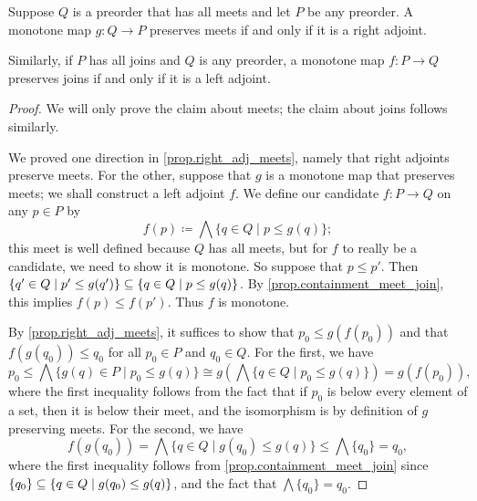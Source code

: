 \documentclass[7Sketches]{subfiles}
\begin{document}
\begin{theorem}%
\label{prop.adjoint_functor_thm}%
Suppose $Q$ is a preorder that has all meets and let $P$ be any preorder. A monotone map $g\colon Q \to P$
preserves meets if and only if it is a right adjoint. 

Similarly, if $P$ has all joins and $Q$ is any preorder, a monotone map $f\colon P \to Q$ preserves joins if
and only if it is a left adjoint.
\end{theorem}
\begin{proof}
We will only prove the claim about meets; the claim about joins follows similarly.

We proved one direction in \cref{prop.right_adj_meets}, namely that right adjoints preserve meets. For the other, suppose that $g$ is a
monotone map that preserves meets; we shall construct a left adjoint $f$. We define our candidate $f\colon P \to Q$ on any $p\in P$ by
\begin{equation}%
\label{eqn.def_f_random596}
  f(p)\coloneqq\bigwedge \{q \in Q \mid p\leq g(q)\};
\end{equation}
this meet is well defined because $Q$ has all meets, but for $f$ to really be a candidate, we need to show it is monotone. So suppose that $p\leq p'$. Then $\{q' \in Q \mid p'\leq g(q')\}\ss\{q \in Q \mid p\leq g(q)\}$. By \cref{prop.containment_meet_join}, this implies $f(p)\leq f(p')$. Thus $f$ is monotone.

By \cref{prop.right_adj_meets}, it suffices to show that $p_0\leq g(f(p_0))$ and that $f(g(q_0))\leq q_0$ for all $p_0\in P$ and $q_0\in Q$. For the first, we have
\[
  p_0\leq
  \bigwedge\{g(q)\in P\mid p_0\leq g(q)\}\cong
  g\left(\bigwedge\{q\in Q\mid p_0\leq g(q)\}\right)=
  g(f(p_0)),
\]
where the first inequality follows from the fact that if $p_0$ is below every element of a set, then it is below their meet, and the isomorphism is by definition of $g$ preserving meets. For the second, we have
\[
	f(g(q_0))=\bigwedge\{q\in Q\mid g(q_0)\leq g(q)\}\leq\bigwedge\{q_0\}=q_0,
\]
where the first inequality follows from \cref{prop.containment_meet_join} since $\{q_0\}\ss\{q\in Q\mid g(q_0)\leq g(q)\}$, and the fact that $\bigwedge\{q_0\}=q_0$.
\end{proof}
\end{document}
